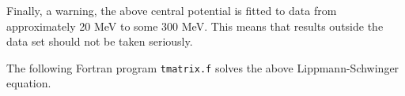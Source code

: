\documentclass[graybox,sectrefs,envcountresetchap,open=right]{svmonodo}
\newenvironment{doconceexercise}{}{}
\begin{document}
\begin{doconceexercise}
Finally, a warning, the above central potential is fitted  
to data from approximately 
20 MeV to some 300 MeV. This means that results outside
the data set should not be taken seriously.

The following Fortran program {\tt tmatrix.f} solves the above Lippmann-Schwinger equation. 
\begin{comment}
\begin{lstlisting}[language=fortran]
C     *******************************************************
C         Example program used to evaluate the 
C         T-matrix following Kowalski's method (eqs V88 & V89
C         in Brown and Jackson)  
C         for positive energies only
C         The program is set up for S-waves only
C         Coded by : Morten Hjorth-Jensen
C         Language : FORTRAN 90
C     *******************************************************



C               ******************************
C                 Def of global variables
C               ******************************


      MODULE constants
         DOUBLE PRECISION , PUBLIC :: p_mass, hbarc
         PARAMETER (p_mass =938.926D0, hbarc = 197.327D0)
      END MODULE constants

      MODULE mesh_variables           
         INTEGER, PUBLIC :: n_rel
         PARAMETER(n_rel=48)
         DOUBLE PRECISION, ALLOCATABLE, PUBLIC :: ra(:), wra(:)
      END MODULE  mesh_variables


C               ******************************
C                   Begin of main program
C               ******************************


      PROGRAM t_matrix
      USE mesh_variables
      IMPLICIT NONE
      INTEGER istat

      ALLOCATE( ra (n_rel), wra (n_rel),  STAT=istat )
      CALL rel_mesh               ! rel mesh & weights
      CALL t_channel              ! calculate the T-matrix
      DEALLOCATE( ra,wra, STAT=istat )

      END PROGRAM t_matrix

C     *********************************************************
C                    obtain the t-mtx
C                    vkk is the box potential
C                    f_mtx is equation V88 og Brown & Jackson
C     *********************************************************

      SUBROUTINE t_channel
      USE mesh_variables
      IMPLICIT NONE
      INTEGER istat, i,j
      DIMENSION vkk(:,:),f_mtx(:),t_mtx(:)
      DOUBLE PRECISION, ALLOCATABLE :: vkk,t_mtx,f_mtx
      DOUBLE PRECISION t_shell


\end{comment}
\end{doconceexercise}
\end{document}

